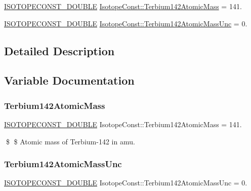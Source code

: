 \begin{DoxyCompactItemize}
\item 
\mbox{\hyperlink{group___isotope_const-_macros_ga8f45a7272ce02c0b4c65c44636ed719a}{I\+S\+O\+T\+O\+P\+E\+C\+O\+N\+S\+T\+\_\+\+D\+O\+U\+B\+LE}} \mbox{\hyperlink{group___isotope_const-_terbium-_tb142_ga6e234e321301790c496733b13e2ca15f}{Isotope\+Const\+::\+Terbium142\+Atomic\+Mass}} = 141.
\item 
\mbox{\hyperlink{group___isotope_const-_macros_ga8f45a7272ce02c0b4c65c44636ed719a}{I\+S\+O\+T\+O\+P\+E\+C\+O\+N\+S\+T\+\_\+\+D\+O\+U\+B\+LE}} \mbox{\hyperlink{group___isotope_const-_terbium-_tb142_gaefe496c8786933b7e3cd64860a5cdda3}{Isotope\+Const\+::\+Terbium142\+Atomic\+Mass\+Unc}} = 0.
\end{DoxyCompactItemize}


\subsection{Detailed Description}


\subsection{Variable Documentation}
\mbox{\label{group___isotope_const-_terbium-_tb142_ga6e234e321301790c496733b13e2ca15f}} 
\subsubsection{\texorpdfstring{Terbium142\+Atomic\+Mass}{Terbium142AtomicMass}}
{\footnotesize\ttfamily \mbox{\hyperlink{group___isotope_const-_macros_ga8f45a7272ce02c0b4c65c44636ed719a}{I\+S\+O\+T\+O\+P\+E\+C\+O\+N\+S\+T\+\_\+\+D\+O\+U\+B\+LE}} Isotope\+Const\+::\+Terbium142\+Atomic\+Mass = 141.}

\$ \$ Atomic mass of Terbium-\/142 in amu. \mbox{\label{group___isotope_const-_terbium-_tb142_gaefe496c8786933b7e3cd64860a5cdda3}} 
\subsubsection{\texorpdfstring{Terbium142\+Atomic\+Mass\+Unc}{Terbium142AtomicMassUnc}}
{\footnotesize\ttfamily \mbox{\hyperlink{group___isotope_const-_macros_ga8f45a7272ce02c0b4c65c44636ed719a}{I\+S\+O\+T\+O\+P\+E\+C\+O\+N\+S\+T\+\_\+\+D\+O\+U\+B\+LE}} Isotope\+Const\+::\+Terbium142\+Atomic\+Mass\+Unc = 0.}

